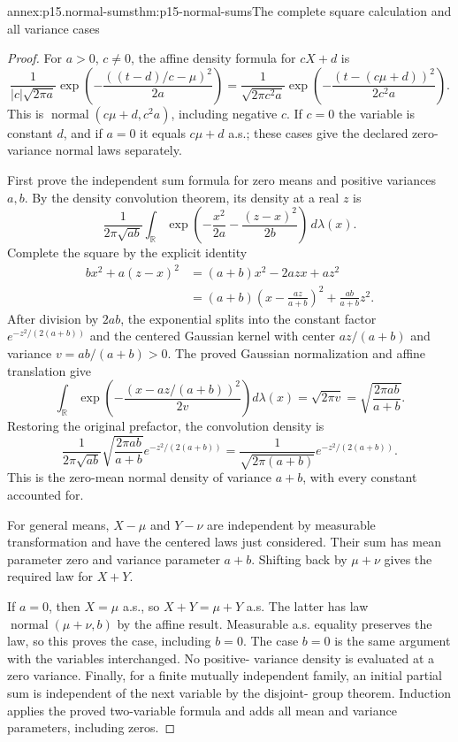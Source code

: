 \begin{annexitem}{annex:p15.normal-sums}{thm:p15-normal-sums}{The complete square calculation and all variance cases}
\begin{proof}
For \(a>0\), \(c\ne0\), the affine density formula for
\(cX+d\) is
\[
 \frac1{|c|\sqrt{2\pi a}}
       \exp\left(-\frac{((t-d)/c-\mu)^2}{2a}\right)
  =\frac1{\sqrt{2\pi c^2a}}
       \exp\left(-\frac{(t-(c\mu+d))^2}{2c^2a}\right).
\]
This is \(\operatorname{normal}(c\mu+d,c^2a)\), including
negative \(c\). If \(c=0\) the variable is constant \(d\),
and if \(a=0\) it equals \(c\mu+d\) a.s.; these cases give
the declared zero-variance normal laws separately.

First prove the independent sum formula for zero means and positive
variances \(a,b\). By the density convolution theorem, its
density at a real \(z\) is
\[
 \frac1{2\pi\sqrt{ab}}
       \int_{\mathbb R}
          \exp\left(-\frac{x^2}{2a}-\frac{(z-x)^2}{2b}\right)
                                             \,d\lambda(x).
\]
Complete the square by the explicit identity
\[
 \begin{aligned}
 bx^2+a(z-x)^2
    &=(a+b)x^2-2azx+az^2\\
    &=(a+b)\left(x-\frac{az}{a+b}\right)^2
                          +\frac{ab}{a+b}z^2.
 \end{aligned}
\]
After division by \(2ab\), the exponential splits into the
constant factor \(e^{-z^2/(2(a+b))}\) and the centered Gaussian
kernel with center \(az/(a+b)\) and variance
\(v=ab/(a+b)>0\). The proved Gaussian normalization and affine
translation give
\[
 \int_{\mathbb R}
       \exp\left(-\frac{(x-az/(a+b))^2}{2v}\right)d\lambda(x)
                         =\sqrt{2\pi v}
                         =\sqrt{\frac{2\pi ab}{a+b}}.
\]
Restoring the original prefactor, the convolution density is
\[
 \frac1{2\pi\sqrt{ab}}\sqrt{\frac{2\pi ab}{a+b}}
              e^{-z^2/(2(a+b))}
       =\frac1{\sqrt{2\pi(a+b)}}e^{-z^2/(2(a+b))}.
\]
This is the zero-mean normal density of variance \(a+b\),
with every constant accounted for.

For general means, \(X-\mu\) and \(Y-\nu\) are independent
by measurable transformation and have the centered laws just
considered. Their sum has mean parameter zero and variance parameter
\(a+b\). Shifting back by \(\mu+\nu\) gives the required
law for \(X+Y\).

If \(a=0\), then \(X=\mu\) a.s., so \(X+Y=\mu+Y\)
a.s. The latter has law \(\operatorname{normal}(\mu+\nu,b)\)
by the affine result. Measurable a.s. equality preserves the law,
so this proves the case, including \(b=0\). The case \(b=0\)
is the same argument with the variables interchanged. No positive-
variance density is evaluated at a zero variance.
Finally, for a finite mutually independent family, an initial
partial sum is independent of the next variable by the disjoint-
group theorem. Induction applies the proved two-variable formula
and adds all mean and variance parameters, including zeros.
\end{proof}
\end{annexitem}

